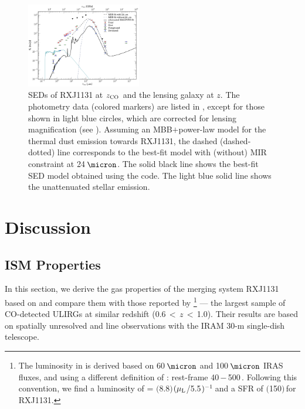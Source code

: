 \documentclass[]{emulateapj}
\begin{document}
\begin{figure}[!htbp]
\centering
\includegraphics[trim=5 5 5 5, clip, width=0.445\textwidth]{../Figures/FullSED_withMagphys}
\caption{SEDs of RXJ1131 at
$z_{\rm CO}$ and the lensing galaxy at $z$.
The photometry data (colored markers) are listed in , except for those
shown in light blue circles, which are corrected for lensing magnification (see ).
Assuming an MBB$+$power-law model for the thermal dust emission towards RXJ1131,
the dashed (dashed-dotted) line corresponds to the best-fit model
with (without) MIR constraint at 24\,$\micron$.
The solid black line shows the best-fit SED model obtained using the  code.
The light blue solid line shows the unattenuated stellar emission. 
\label{fig:SED}}
\end{figure}

\section{Discussion} \label{sec:diss}


\subsection{ISM Properties} \label{sec:properties}
In this section, we derive the gas properties of the merging system RXJ1131
based on \bco and compare them with those reported by
\footnote{The
\fir luminosity in  is derived based on 60\,$\micron$ and 100\,$\micron$ IRAS fluxes,
and using a different definition of
\LFIR: rest-frame 40\,$-$\,500\,\micron. Following this convention,
we find a \fir luminosity of
\LFIR = $($8.8$)$$(\mu_{\rm L}$/5.5$)\mbox{$^{-1}$}$\,\Lsun and
a SFR of $($150$)$\,\sfrU for RXJ1131.} --- the largest sample of CO-detected ULIRGs at similar redshift
(0.6\,$<$\,$z$\,$<$\,1.0).
Their results are based on spatially unresolved \bco and  line observations with the
IRAM 30-m single-dish telescope.
\end{document}
